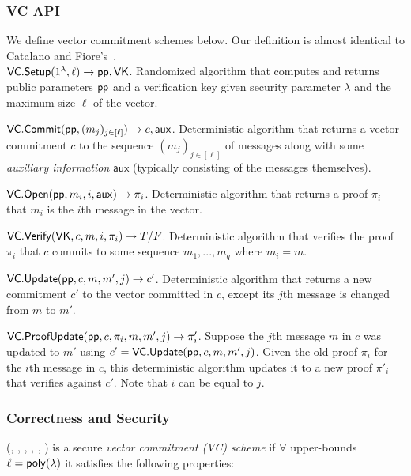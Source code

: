 \subsubsection{VC API}
We define vector commitment schemes below.
Our definition is almost identical to Catalano and Fiore's~\cite{CF13}.
\\

\api $\mathsf{VC.Setup}(1^\lambda, \ell)\rightarrow \mathsf{pp},\mathsf{VK}$.
Randomized algorithm that computes and returns public parameters $\mathsf{pp}$ and a verification key \vk given security parameter $\lambda$ and the maximum size $\ell$ of the vector.

\api $\mathsf{VC.Commit}(\mathsf{pp}, (m_j)_{j\in[\ell]}) \rightarrow c,\mathsf{aux}$.
Deterministic algorithm that returns a vector commitment $c$ to the sequence $(m_j)_{j\in[\ell]}$ of messages along with some \textit{auxiliary information} $\mathsf{aux}$ (typically consisting of the messages themselves).

\api $\mathsf{VC.Open}(\mathsf{pp}, m_i, i, \mathsf{aux}) \rightarrow \pi_i$.
Deterministic algorithm that returns a proof $\pi_i$ that $m_i$ is the $i$th message in the vector.

\api $\mathsf{VC.Verify}(\mathsf{VK}, c, m, i, \pi_i) \rightarrow T/F$.
Deterministic algorithm that verifies the proof $\pi_i$ that $c$ commits to some sequence $m_1, ..., m_q$ where $m_i = m$.

\api $\mathsf{VC.Update}(\mathsf{pp}, c, m, m', j)\rightarrow c'$.
Deterministic algorithm that returns a new commitment $c'$ to the vector committed in $c$, except its $j$th message is changed from $m$ to $m'$.

\api $\mathsf{VC.ProofUpdate}(\mathsf{pp}, c, \pi_i, m, m', j)\rightarrow \pi'_i$.
Suppose the $j$th message $m$ in $c$ was updated to $m'$ using $c' = \mathsf{VC.Update}(\mathsf{pp},c,m,m',j)$.
Given the old proof $\pi_i$ for the $i$th message in $c$, this deterministic algorithm updates it to a new proof $\pi'_i$ that verifies against $c'$.
Note that $i$ can be equal to $j$.

\subsubsection{Correctness and Security}

\begin{definition}
    \label{def:vc}
    (\vcsetup, \vccommit, \vcopen, \vcverify, \vcupdate, \vcproofupdate) is a secure \textit{vector commitment (VC) scheme} if
    $\forall$ upper-bounds $\ell=\mathsf{poly}(\lambda)$
    it satisfies the following properties:
\end{definition}

